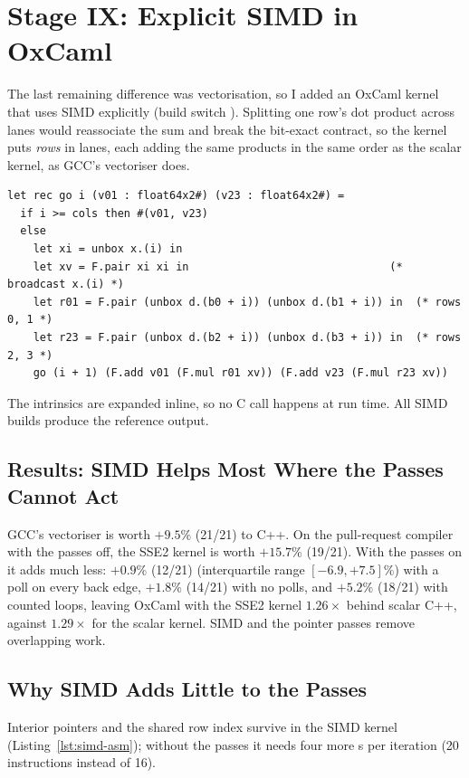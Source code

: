 \section{Stage IX: Explicit SIMD in OxCaml}
\label{sec:simd}

The last remaining difference was vectorisation, so I added an OxCaml kernel
that uses SIMD explicitly (build switch ). Splitting one row's
dot product across lanes would reassociate the sum and break the bit-exact
contract, so the kernel puts \emph{rows} in lanes, each adding the same
products in the same order as the scalar kernel, as GCC's vectoriser does.

\begin{lstlisting}[language=OCamlX,caption={The SSE2 kernel's inner loop. \texttt{F.add} and \texttt{F.mul} are \texttt{[@@builtin]} externals on the unboxed 128-bit type \texttt{float64x2\#}.},label=lst:simd]
let rec go i (v01 : float64x2#) (v23 : float64x2#) =
  if i >= cols then #(v01, v23)
  else
    let xi = unbox x.(i) in
    let xv = F.pair xi xi in                               (* broadcast x.(i) *)
    let r01 = F.pair (unbox d.(b0 + i)) (unbox d.(b1 + i)) in  (* rows 0, 1 *)
    let r23 = F.pair (unbox d.(b2 + i)) (unbox d.(b3 + i)) in  (* rows 2, 3 *)
    go (i + 1) (F.add v01 (F.mul r01 xv)) (F.add v23 (F.mul r23 xv))
\end{lstlisting}

The intrinsics are expanded inline, so no C call happens at run time. All
SIMD builds produce the reference output.

\subsection{Results: SIMD Helps Most Where the Passes Cannot Act}
\label{fig:interaction}
GCC's vectoriser is worth $+9.5\%$ (21/21) to C++. On the
pull-request compiler with the passes off, the SSE2 kernel is worth
$+15.7\%$ (19/21). With the passes on it adds much less:
$+0.9\%$ (12/21) (interquartile range $[-6.9, +7.5]\%$) with a poll on
every back edge, $+1.8\%$ (14/21) with no polls, and
$+5.2\%$ (18/21) with counted loops, leaving OxCaml with the
SSE2 kernel $1.26\times$ behind scalar C++, against $1.29\times$
for the scalar kernel. SIMD and the pointer passes remove
overlapping work.

\subsection{Why SIMD Adds Little to the Passes}
\label{sec:simd-why}
Interior pointers and the shared row index survive in the SIMD kernel
(Listing~\ref{lst:simd-asm}); without the passes it needs four more
s per iteration (20 instructions instead of 16).

